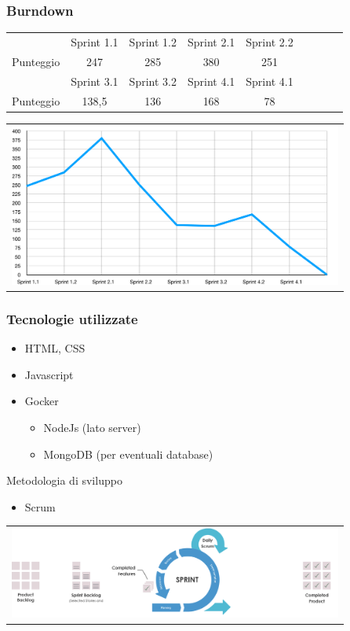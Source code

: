 \documentclass{beamer}
\begin{document}
\begin{frame}
\frametitle{Burndown}
\centering
\begin{tabular}{|c|c|c|c|c|c|c|c|c|}
\hline
					& Sprint 1.1	& Sprint 1.2	&Sprint 2.1	&Sprint 2.2	\\
Punteggio		& 247			& 285			& 380			& 251			\\
\hline
					&Sprint 3.1	&Sprint 3.2	&Sprint 4.1	&Sprint 4.1    \\
Punteggio 	& 138,5			& 136			& 168			& 78 			 	 \\
\hline
\end{tabular}
 \centering
        \begin{tabular}{c}
        \includegraphics[width=11cm]{../burndown/burndown_slides.png}
      \end{tabular}
\end{frame}

\begin{frame}
\frametitle{Tecnologie utilizzate}
\begin{itemize}
  \item HTML, CSS
  \item Javascript
  \item Gocker
  \begin{itemize}
  \item NodeJs (lato server)
  \item MongoDB (per eventuali database)
\end{itemize}
\end{itemize}
\vaspace{2mm}
Metodologia di sviluppo
  \begin{itemize}
  \item Scrum
\end{itemize}
      \centering  \begin{tabular}{c}
        \includegraphics[width=11cm]{Images/scrum/scrum-sprint}
      \end{tabular}
\end{frame}
\end{document}
